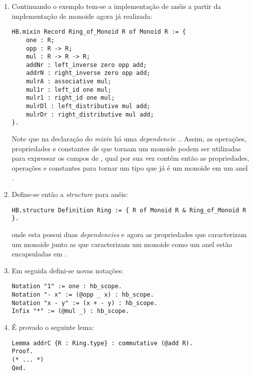 {{\begin{enumerate}
        \item Continuando o exemplo tem-se a implementação de anéis a partir da implementação de monoide agora já realizada:
            \begin{lstlisting}[language=coq, frame=single, tabsize=1]
HB.mixin Record Ring_of_Monoid R of Monoid R := {
    one : R;
    opp : R -> R;
    mul : R -> R -> R;
    addNr : left_inverse zero opp add;
    addrN : right_inverse zero opp add;
    mulrA : associative mul;
    mul1r : left_id one mul;
    mulr1 : right_id one mul;
    mulrDl : left_distributive mul add;
    mulrDr : right_distributive mul add;
}.
            \end{lstlisting}    
        Note que na declaração do \textit{mixin} há uma \textit{dependencie}  \cite{cohen:hal-02478907}.. Assim, as operações, propriedades e constantes de que tornam  um monoide podem ser utilizadas para expressar os campos de , qual por sua vez contém então as propriedades, operações e constantes para tornar um tipo que já é um monoide em um anel \cite{cohen:hal-02478907}.
        
        \item Define-se então a \textit{structure} para anéis:
            \begin{lstlisting}[language=coq, frame=single, tabsize=1]
HB.structure Definition Ring := { R of Monoid R & Ring_of_Monoid R }.
            \end{lstlisting}
        onde esta possui duas \textit{dependencies} e agora as propriedades
        que caracterizam um monoide junto as que caracterizam um monoide como um anel estão encapsuladas em  \cite{cohen:hal-02478907}.

        \item Em seguida defini-se novas notações: 
            \begin{lstlisting}[language=coq, frame=single, tabsize=1]
Notation "1" := one : hb_scope.
Notation "- x" := (@opp _ x) : hb_scope.
Notation "x - y" := (x + - y) : hb_scope.
Infix "*" := (@mul _) : hb_scope.
            \end{lstlisting}

        \item É provado o seguinte lema:
            \begin{lstlisting}[language=coq, frame=single, tabsize=1]
Lemma addrC {R : Ring.type} : commutative (@add R).
Proof.
(* ... *)
Qed.
            \end{lstlisting}


\end{enumerate}}}
